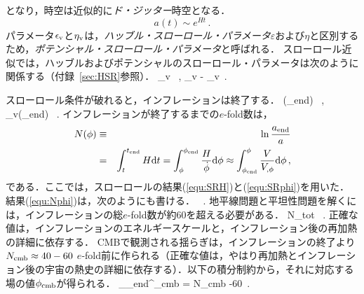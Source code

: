 となり，時空は近似的に{\it ド・ジッター}時空となる．
\begin{equation}
a(t) \sim e^{Ht}\, . %
\end{equation}
パラメータ$\epsilon_{\rm v}$と$\eta_{\rm v}$は，{\it ハッブル・スローロール・パラメータ}$\varepsilon$および$\eta$と区別するため，{\it ポテンシャル・スローロール・パラメータ}と呼ばれる．
スローロール近似では，ハッブルおよびポテンシャルのスローロール・パラメータは次のように関係する（付録~\ref{sec:HSR}参照）．
\beq
\varepsilon \approx \epsilon_{\rm v} \, , \qquad \eta \approx \eta_{\rm v} - \epsilon_{\rm v}\, .
\eeq

スローロール条件が破れると，インフレーションは終了する．%
\beq
\varepsilon(\phi_{\rm end}) \, , \qquad \epsilon_{\rm v}(\phi_{\rm end}) \, .
\eeq
インフレーションが終了するまでの$e$-fold数は，
\begin{eqnarray}
N(\phi) &\equiv& \ln \frac{a_{\rm end}}{a} \nonumber\\
&=&\int_t^{t_{\rm end}} H {\rm d} t = \int_\phi^{\phi_{\rm end}} \frac{H}{\dot \phi} {\rm d} \phi 
\approx \int_{\phi_{\rm end}}^\phi \frac{V}{V_{,\phi}} {\rm d} \phi \, , \label{equ:Nphi}
\end{eqnarray}
である．ここでは，スローロールの結果(\ref{equ:SRH})と(\ref{equ:SRphi})を用いた．
結果(\ref{equ:Nphi})は，次のようにも書ける．
\beq
{}\, .
\eeq
地平線問題と平坦性問題を解くには，インフレーションの総$e$-fold数が約60を超える必要がある．
\beq
N_{\rm tot} \equiv \ln {} \, .
\eeq
正確な値は，インフレーションのエネルギースケールと，インフレーション後の再加熱の詳細に依存する．
CMBで観測される揺らぎは，インフレーションの終了より$N_{\rm cmb} \approx 40-60$ $e$-fold前に作られる（正確な値は，やはり再加熱とインフレーション後の宇宙の熱史の詳細に依存する）．以下の積分制約から，それに対応する場の値$\phi_{\rm cmb}$が得られる．
\beq
 \int_{\phi_{\rm end}}^{\phi_{\rm cmb}}  = N_{\rm cmb}  -60\, .
\eeq


